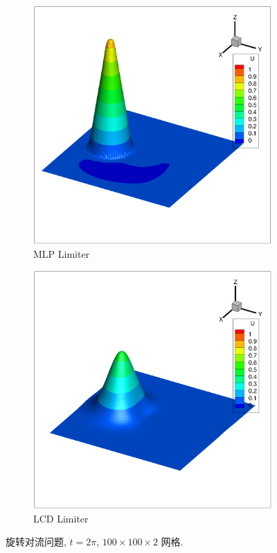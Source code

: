 \begin{figure}
  \begin{subfigure}{.5\textwidth}
    \centering
    \includegraphics[width=.8\linewidth]{./Pho/Chp3/solidbodyrotation_MLP_mesh100.eps}
    \caption{MLP Limiter}
    \label{fig:sfig1}
  \end{subfigure}%
  \begin{subfigure}{.5\textwidth}
    \centering
    \includegraphics[width=.8\linewidth]{./Pho/Chp3/solidbodyrotation_Barth_mesh100.eps}
    \caption{LCD Limiter}
    \label{fig:sfig2}
  \end{subfigure}
  \caption{旋转对流问题, $t= 2 \pi$, $100\times 100 \times 2$ 网格.}
  \label{fig:solid-body-rotation-test-case}
\end{figure}
